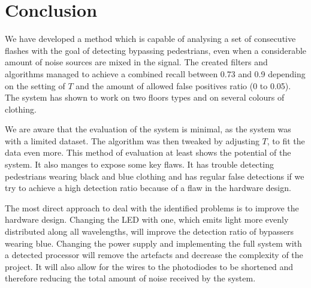 \section{Conclusion}
We have developed a method which is capable of analysing a set of consecutive flashes with the goal of detecting bypassing pedestrians, even when a considerable amount of noise sources are mixed in the signal. The created filters and algorithms managed to achieve a combined recall between 0.73 and 0.9 depending on the setting of $T$ and the amount of allowed false positives ratio (0 to 0.05). The system has shown to work on two floors types and on several colours of clothing.

We are aware that the evaluation of the system is minimal, as the system was with a limited dataset. The algorithm was then tweaked by adjusting $T$, to fit the data even more. This method of evaluation at least shows the potential of the system. It also manges to expose some key flaws. It has trouble detecting pedestrians wearing black and blue clothing and has regular false detections if we try to achieve a high detection ratio because of a flaw in the hardware design.

The most direct approach to deal with the identified problems is to improve the hardware design. Changing the LED with one, which emits light more evenly distributed along all wavelengths, will improve the detection ratio of bypassers wearing blue. Changing the power supply and implementing the full system with a detected processor will remove the artefacts and decrease the complexity of the project. It will also allow for the wires to the photodiodes to be shortened and therefore reducing the total amount of noise received by the system.